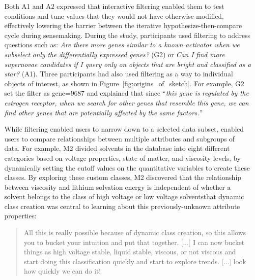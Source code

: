 \par Both A1 and A2 expressed that
interactive filtering enabled
them to test conditions and tune values
that they would not have otherwise modified,
effectively lowering the barrier between
the iterative hypothesize-then-compare cycle during sensemaking.
During the study, participants used filtering
to address questions such as:
\textit{Are there more genes similar
to a known activator when we subselect
only the differentially expressed genes?} (G2) or \textit{Can I find more supernovae candidates if I query only on objects that are bright and classified as a star?} (A1). Three participants had also used filtering as a way to  individual objects of interest, as shown in Figure~\ref{fig:origins_of_sketch}. For example, G2 set the filter as gene=9687 and explained that since ``\textit{this gene is regulated by the estrogen receptor, when we search for other genes that resemble this gene, we can find other genes that are potentially affected by the same factors.}''
\par While filtering enabled users to
narrow down to a selected data subset,
enabled users to compare
relationships between multiple attributes and subgroups of data.
For example, M2 divided solvents in the database
into eight different categories based on voltage properties,
state of matter, and viscosity levels,
by dynamically setting the cutoff values
on the quantitative variables to create these classes.
By exploring these custom classes, M2 discovered that the relationship between viscosity and lithium solvation energy is independent of whether a solvent belongs to the class of high voltage or low voltage solventsthat dynamic class creation was central to learning about this previously-unknown attribute properties:
\begin{quote}
All this is really possible because of dynamic class creation, so this allows you to bucket your intuition and put that together. [...] I can now bucket things as high voltage stable, liquid stable, viscous, or not viscous and start doing this classification quickly and start to explore trends. [...] look how quickly we can do it!%
\end{quote}
